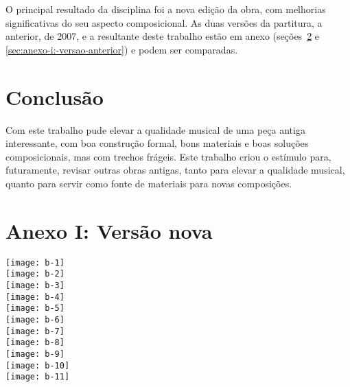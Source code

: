 \documentclass[10pt]{article}
\begin{document}
O principal resultado da disciplina foi a nova edição da obra, com
melhorias significativas do seu aspecto composicional. As duas versões
da partitura, a anterior, de 2007, e a resultante deste trabalho estão
em anexo (seções~\ref{sec:anexo-i:-versao-nova} e
\ref{sec:anexo-i:-versao-anterior}) e podem ser comparadas.

\section{Conclusão}
\label{sec:conclusao}

Com este trabalho pude elevar a qualidade musical de uma peça antiga
interessante, com boa construção formal, bons materiais e boas
soluções composicionais, mas com trechos frágeis. Este trabalho criou
o estímulo para, futuramente, revisar outras obras antigas, tanto para
elevar a qualidade musical, quanto para servir como fonte de materiais
para novas composições.

\onecolumn

\section{Anexo I: Versão nova}
\label{sec:anexo-i:-versao-nova}

\texttt{[image: b-1]} \linebreak \\
\texttt{[image: b-2]} \linebreak \\
\texttt{[image: b-3]} \linebreak \\
\texttt{[image: b-4]} \linebreak \\
\texttt{[image: b-5]} \linebreak \\
\texttt{[image: b-6]} \linebreak \\
\texttt{[image: b-7]} \linebreak \\
\texttt{[image: b-8]} \linebreak \\
\texttt{[image: b-9]} \linebreak \\
\texttt{[image: b-10]} \linebreak \\
\texttt{[image: b-11]} \linebreak \\
\end{document}
